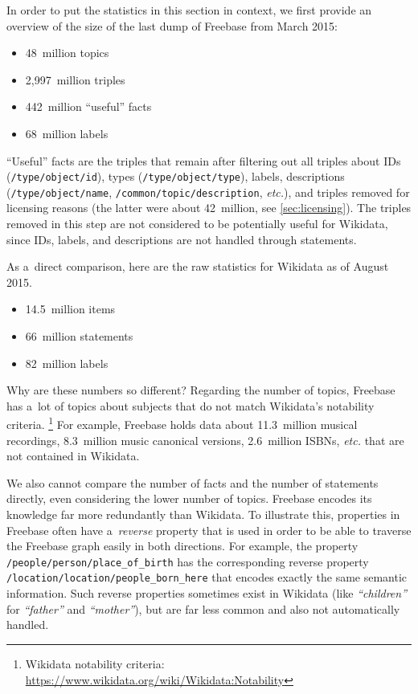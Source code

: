 \documentclass{sig-alternate-2013}
\begin{document}
In order to put the statistics in this section in context,
we first provide an overview of the size of the last dump of Freebase
from March 2015:

\begin{itemize}
  \setlength\itemsep{0em}
  \item 48~million topics
  \item 2,997~million triples
  \item 442~million ``useful'' facts%
  \item 68~million labels
\end{itemize}

``Useful'' facts are the triples that remain
after filtering out all triples about IDs (\texttt{/type/object/id}),
types \linebreak (\texttt{/type/object/type}), labels, descriptions \linebreak
(\texttt{/type/object/name},
\texttt{/common/topic/description}, \emph{etc.}), \linebreak and triples removed
for licensing reasons (the latter were about 42~million, see \autoref{sec:licensing}).
The triples removed in this step are not considered to be potentially useful for
Wikidata, since IDs, labels, and descriptions are not handled through statements.

As a~direct comparison, here are the raw statistics for Wikidata as of August 2015.

\begin{itemize}
    \setlength\itemsep{0em}
    \item 14.5~million items
    \item 66~million statements
    \item 82~million labels
\end{itemize}

Why are these numbers so different?
Regarding the number of topics, Freebase has a~lot of topics about subjects
that do not match Wikidata's notability criteria.%
\footnote{Wikidata notability criteria:
\url{https://www.wikidata.org/wiki/Wikidata:Notability}}
For example, Freebase holds data about 11.3~million musical recordings,
8.3~million music canonical versions, 2.6~million ISBNs, \emph{etc.} that are not contained in Wikidata.

We also cannot compare the number of facts and the number of statements directly,
even considering the lower number of topics.
Freebase encodes its knowledge far more redundantly than Wikidata.
To illustrate this, properties in Freebase often have a~\emph{reverse} property
that is used in order to be able to traverse the Freebase graph easily in both directions.
For example, the property \texttt{/people/person/place\_of\_birth} has the corresponding
reverse property \linebreak \texttt{/location/location/people\_born\_here}
that encodes exactly the same semantic information.
Such reverse properties sometimes exist in Wikidata
(like \textit{``children''} for \textit{``father''} and \textit{``mother''}),
but are far less common and also not automatically handled.
\end{document}
